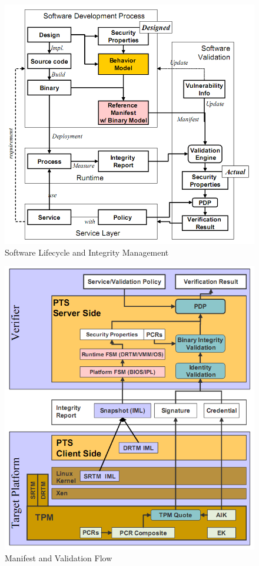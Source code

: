 \documentclass[12pt,a4paper]{article}
\begin{document}
\begin{figure}[b!p]
  \begin{center}
    \includegraphics[width=12cm]{OpenPTS_fig4.png}
  \end{center}
  \caption{Software Lifecycle and Integrity Management}
  \label{lifecyclefig} 
\end{figure}



\begin{figure}[b!p]
  \begin{center}
    \includegraphics[width=12cm]{OpenPTS_fig5.png}
  \end{center}
  \caption{Manifest and Validation Flow}
  \label{flowfig} 
\end{figure}
\end{document}
